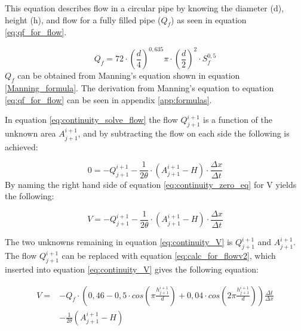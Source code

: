 This equation describes flow in a circular pipe by knowing the diameter (d), height (h), and flow for a fully filled pipe ($Q_f$) as seen in equation \ref{eq:qf_for_flow}. %

\begin{equation}\label{eq:qf_for_flow}
    Q_f =72\cdot \left(\frac{d}{4}\right)^{0,635}\pi\cdot\left(\frac{d}{2}\right)^2\cdot S_f^{0,5}%
\end{equation}
$Q_f$ can be obtained from Manning's equation shown in equation \ref{Manning_formula}. The derivation from Manning's equation to equation \ref{eq:qf_for_flow} can be seen in appendix \ref{app:formulas}.

In equation \ref{eq:continuity_solve_flow} the flow $Q_{j+1}^{i+1}$ is a function of the unknown area $A_{j+1}^{i+1}$, and by subtracting the flow on each side the following is achieved:

\begin{equation}\label{eq:continuity_zero_eq}
        0=-Q_{j+1}^{i+1}  - \frac{1}{2\theta}\cdot\left(A_{j+1}^{i+1}-H\right)\cdot \frac{\Delta x}{\Delta t}
\end{equation}
By naming the right hand side of equation \ref{eq:continuity_zero_eq} for V yields the following:

\begin{equation}\label{eq:continuity_V}
        V=-Q_{j+1}^{i+1}  - \frac{1}{2\theta}\cdot\left(A_{j+1}^{i+1}-H\right)\cdot \frac{\Delta x}{\Delta t}
\end{equation}

The two unknowns remaining in equation \ref{eq:continuity_V} is $Q_{j+1}^{i+1}$ and $A_{j+1}^{i+1}$. The flow $Q_{j+1}^{i+1}$ can be replaced with equation \ref{eq:calc_for_flowv2}, which inserted into equation \ref{eq:continuity_V} gives the following equation:

\begin{equation}\label{eq:V_with_flow}
\begin{aligned}
    V = &-Q_f\cdot\left(0,46-0,5\cdot cos\left(\pi \frac{h_{j+1}^{i+1}}{d}\right)+0,04\cdot cos\left(2\pi\frac{h_{j+1}^{i+1}}{d}\right)\right)\frac{\Delta t}{\Delta x}\\ 
    &-\frac{1}{2\theta}\left(A_{j+1}^{i+1}-H\right)
    \end{aligned}
\end{equation}

